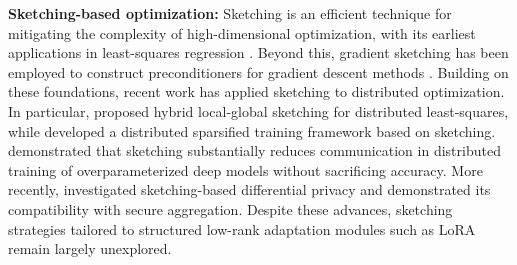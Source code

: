 \documentclass{article} %
\theoremstyle{plain}
\theoremstyle{definition}
\begin{document}
\textbf{Sketching-based optimization:} Sketching is an efficient technique for mitigating the complexity of high-dimensional optimization, with its earliest applications in least-squares regression \citep{sarlos2006improved,wang2022iterative}. Beyond this, gradient sketching has been employed to construct preconditioners for gradient descent methods \citep{gower2015randomized}. Building on these foundations, recent work has applied sketching to distributed optimization. In particular, \citet{charalambides2024distributed} proposed hybrid local-global sketching for distributed least-squares, while \citet{demidovich2023mast} developed a distributed sparsified training framework based on sketching. \citet{shrivastava2024sketching} demonstrated that sketching substantially reduces communication in distributed training of overparameterized deep models without sacrificing accuracy.
More recently, \citet{nicolas2025communication} investigated sketching-based differential privacy and demonstrated its compatibility with secure aggregation.
Despite these advances, sketching strategies tailored to structured low-rank adaptation modules such as LoRA remain largely unexplored.

\end{document}
